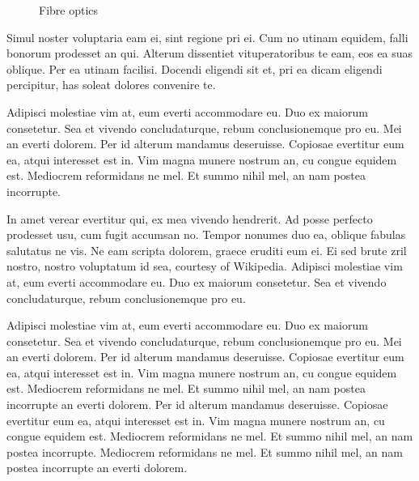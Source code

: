 \begin{figure}[htb]
\begin{center}
  \end{center}
  \caption{Fibre optics}
  \label{CHAPTER3_FIG01}
\end{figure}

Simul noster voluptaria eam ei, sint regione pri ei. Cum no utinam equidem, 
falli bonorum prodesset an qui. Alterum dissentiet vituperatoribus te eam, 
eos ea suas oblique. Per ea utinam facilisi. Docendi eligendi sit et, pri ea 
dicam eligendi percipitur, has soleat dolores convenire te.

Adipisci molestiae vim at, eum everti accommodare eu. Duo ex maiorum 
consetetur. Sea et vivendo concludaturque, rebum conclusionemque pro eu. Mei 
an everti dolorem. Per id alterum mandamus deseruisse. Copiosae evertitur eum 
ea, atqui interesset est in. Vim magna munere nostrum an, cu congue equidem 
est. Mediocrem reformidans ne mel. Et summo nihil mel, an nam postea 
incorrupte.

In amet verear evertitur qui, ex mea vivendo hendrerit. Ad posse perfecto 
prodesset usu, cum fugit accumsan no. Tempor nonumes duo ea, oblique fabulas 
salutatus ne vis. Ne eam scripta dolorem, graece eruditi eum ei. Ei sed brute 
zril nostro, nostro voluptatum id sea, courtesy of Wikipedia. \cite{Wikipedia}
Adipisci molestiae vim at, eum everti accommodare eu. Duo ex maiorum 
consetetur. Sea et vivendo concludaturque, rebum conclusionemque pro eu.

Adipisci molestiae vim at, eum everti accommodare eu. Duo ex maiorum 
consetetur. Sea et vivendo concludaturque, rebum conclusionemque pro eu. Mei 
an everti dolorem. Per id alterum mandamus deseruisse. Copiosae evertitur eum 
ea, atqui interesset est in. Vim magna munere nostrum an, cu congue equidem 
est. Mediocrem reformidans ne mel. Et summo nihil mel, an nam postea 
incorrupte an everti dolorem. Per id alterum mandamus deseruisse. Copiosae 
evertitur eum ea, atqui interesset est in. Vim magna munere nostrum an, cu 
congue equidem est. Mediocrem reformidans ne mel. Et summo nihil mel, an nam 
postea incorrupte. Mediocrem reformidans ne mel. Et summo nihil mel, an nam 
postea incorrupte an everti dolorem. 

